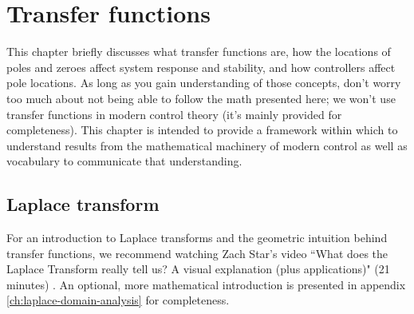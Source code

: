 
\chapter{Transfer functions}

This chapter briefly discusses what transfer functions are, how the locations of
poles and zeroes affect \gls{system response} and stability, and how controllers
affect pole locations. As long as you gain understanding of those concepts,
don't worry too much about not being able to follow the math presented here; we
won't use transfer functions in modern control theory (it's mainly provided for
completeness). This chapter is intended to provide a framework within which to
understand results from the mathematical machinery of modern control as well as
vocabulary to communicate that understanding.

\section{Laplace transform}

For an introduction to Laplace transforms and the geometric intuition behind
transfer functions, we recommend watching Zach Star's video ``What does the
Laplace Transform really tell us? A visual explanation (plus applications)" (21
minutes) \cite{bib:laplace_transform}. An optional, more mathematical
introduction is presented in appendix \ref{ch:laplace-domain-analysis} for
completeness.

\renewcommand*{\chapterpath}{\partpath/transfer-functions}


